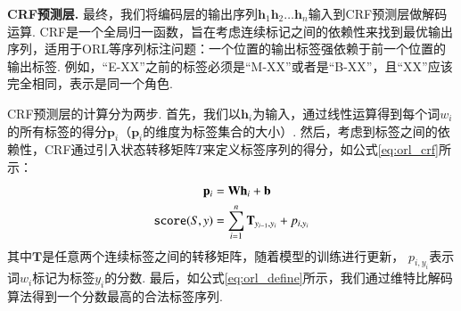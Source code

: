 \textbf{CRF预测层.  }
最终，我们将编码层的输出序列$\mathbf{h}_1 \mathbf{h}_2\dots \mathbf{h}_n$输入到CRF预测层做解码运算. CRF是一个全局归一函数，旨在考虑连续标记之间的依赖性来找到最优输出序列，适用于ORL等序列标注问题：一个位置的输出标签强依赖于前一个位置的输出标签. 例如，“E-XX”之前的标签必须是“M-XX”或者是“B-XX”，且“XX”应该完全相同，表示是同一个角色.

CRF预测层的计算分为两步. 首先，我们以$\mathbf{h}_i$为输入，通过线性运算得到每个词$w_i$的所有标签的得分$\mathbf{p}_i$（$\mathbf{p}_i$的维度为标签集合的大小）.
然后，考虑到标签之间的依赖性，CRF通过引入状态转移矩阵$T$来定义标签序列的得分，如公式\ref{eq:orl_crf}所示：
%
\begin{equation}\label{eq:orl_crf}
    \setlength{\abovedisplayskip}{9pt}
    \setlength{\belowdisplayskip}{9pt}
    \begin{split}
        \mathbf{p}_i &= \mathbf{W}\mathbf{h}_i+\mathbf{b} \\
        \texttt{score}(S, y) &= \sum_{i=1}^n \mathbf{T}_{y_{i-1}, y_i} + p_{i,y_i}
    \end{split}
\end{equation}
其中$\mathbf{T}$是任意两个连续标签之间的转移矩阵，随着模型的训练进行更新， $p_{i,y_i}$表示词$w_i$标记为标签$y_i$的分数. 最后，如公式\ref{eq:orl_define}所示，我们通过维特比解码算法得到一个分数最高的合法标签序列.


%



